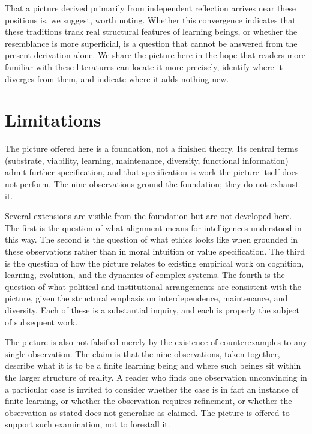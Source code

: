 \documentclass[11pt]{article}
\begin{document}
That a picture derived primarily from independent reflection arrives 
near these positions is, we suggest, worth noting. Whether this 
convergence indicates that these traditions track real structural 
features of learning beings, or whether the resemblance is more 
superficial, is a question that cannot be answered from the present 
derivation alone. We share the picture here in the hope that readers 
more familiar with these literatures can locate it more precisely, 
identify where it diverges from them, and indicate where it adds 
nothing new.

\section{Limitations}

The picture offered here is a foundation, not a finished theory. Its 
central terms (substrate, viability, learning, maintenance, diversity, 
functional information) admit further specification, and that 
specification is work the picture itself does not perform. The nine 
observations ground the foundation; they do not exhaust it.

Several extensions are visible from the foundation but are not 
developed here. The first is the question of what alignment means for 
intelligences understood in this way. The second is the question of 
what ethics looks like when grounded in these observations rather than 
in moral intuition or value specification. The third is the question 
of how the picture relates to existing empirical work on cognition, 
learning, evolution, and the dynamics of complex systems. The fourth 
is the question of what political and institutional arrangements are 
consistent with the picture, given the structural emphasis on 
interdependence, maintenance, and diversity. Each of these is a 
substantial inquiry, and each is properly the subject of subsequent 
work.

The picture is also not falsified merely by the existence of 
counterexamples to any single observation. The claim is that the nine 
observations, taken together, describe what it is to be a finite 
learning being and where such beings sit within the larger structure 
of reality. A reader who finds one observation unconvincing in a 
particular case is invited to consider whether the case is in fact an 
instance of finite learning, or whether the observation requires 
refinement, or whether the observation as stated does not generalise 
as claimed. The picture is offered to support such examination, not 
to forestall it.
\end{document}
